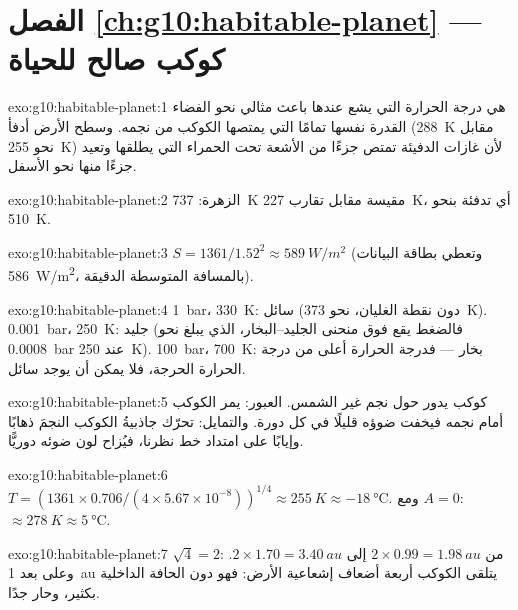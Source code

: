 \section*{الفصل \ref{ch:g10:habitable-planet} --- كوكب صالح للحياة}

\begin{solution}{exo:g10:habitable-planet:1}
هي درجة الحرارة التي يشع عندها باعث مثالي نحو الفضاء القدرة نفسها تمامًا التي
يمتصها الكوكب من نجمه. وسطح الأرض أدفأ
(\qty{288}{K} مقابل نحو \qty{255}{K}) لأن غازات الدفيئة تمتص جزءًا من الأشعة
تحت الحمراء التي يطلقها وتعيد جزءًا منها نحو الأسفل.
\end{solution}

\begin{solution}{exo:g10:habitable-planet:2}
الزهرة: \qty{737}{K} مقيسة مقابل  تقارب
\qty{227}{K}، أي تدفئة بنحو \qty{510}{K}.
\end{solution}

\begin{solution}{exo:g10:habitable-planet:3}
$S = 1361/1.52^2 \approx \qty{589}{W/m^2}$ (وتعطي بطاقة البيانات
\qty{586}{W/m^2}، بالمسافة المتوسطة الدقيقة).
\end{solution}

\begin{solution}{exo:g10:habitable-planet:4}
\qty{1}{bar}، \qty{330}{K}: سائل (دون نقطة الغليان، نحو
\qty{373}{K}). \qty{0.001}{bar}، \qty{250}{K}: جليد (فالضغط يقع فوق منحنى
الجليد--البخار، الذي يبلغ نحو \qty{0.0008}{bar} عند \qty{250}{K}).
\qty{100}{bar}، \qty{700}{K}: بخار --- فدرجة الحرارة أعلى من درجة الحرارة
الحرجة، فلا يمكن أن يوجد سائل.
\end{solution}

\begin{solution}{exo:g10:habitable-planet:5}
كوكب يدور حول نجم غير الشمس. العبور: يمر الكوكب أمام نجمه فيخفت ضوؤه قليلًا في
كل دورة. والتمايل: تحرّك جاذبيةُ الكوكب النجمَ ذهابًا وإيابًا على امتداد خط
نظرنا، فيُزاح لون ضوئه دوريًّا.
\end{solution}

\begin{solution}{exo:g10:habitable-planet:6}
$T = (1361 \times 0.706/(4 \times 5.67\times10^{-8}))^{1/4} \approx
\qty{255}{K} \approx \qty{-18}{\degreeCelsius}$. ومع $A = 0$:
$\approx \qty{278}{K} \approx \qty{5}{\degreeCelsius}$.
\end{solution}

\begin{solution}{exo:g10:habitable-planet:7}
$\sqrt 4 = 2$: من $2 \times 0.99 = \qty{1.98}{au}$ إلى $2 \times 1.70 =
\qty{3.40}{au}$. وعلى بعد \qty{1}{au} يتلقى الكوكب أربعة أضعاف إشعاعية
الأرض: فهو دون الحافة الداخلية بكثير، وحار جدًا.
\end{solution}

